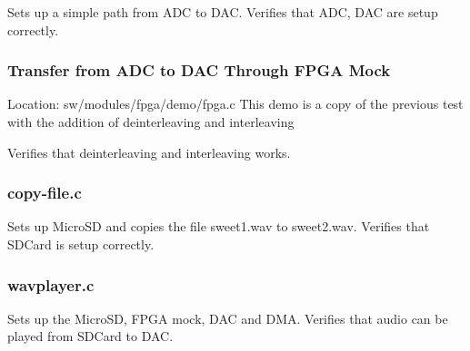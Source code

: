 Sets up a simple path from ADC to DAC.
Verifies that ADC, DAC are setup correctly.

\subsubsection{Transfer from ADC to DAC Through FPGA Mock}
Location: sw/modules/fpga/demo/fpga.c
This demo is a copy of the previous test with the addition of deinterleaving and interleaving


Verifies that deinterleaving and interleaving works.

\subsubsection{copy-file.c}
Sets up MicroSD and copies the file sweet1.wav to sweet2.wav.
Verifies that SDCard is setup correctly.

\subsubsection{wavplayer.c}
Sets up the MicroSD, FPGA mock, DAC and DMA.
Verifies that audio can be played from SDCard to DAC.
